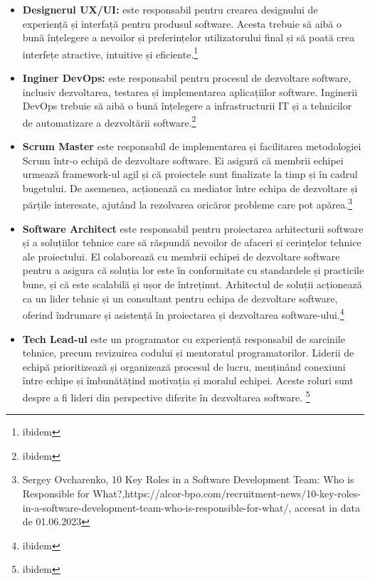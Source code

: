 \documentclass[a4paper, 12pt]{article}
\begin{document}
\begin{itemize}
	\item \textbf{Designerul UX/UI:} este responsabil pentru crearea designului de experiență și interfață pentru produsul software. Acesta trebuie să aibă o bună înțelegere a nevoilor și preferințelor utilizatorului final și să poată crea interfețe atractive, intuitive și eficiente.\footnote{ibidem}

	\item\textbf{Inginer DevOps:}  este responsabil pentru procesul de dezvoltare software, inclusiv dezvoltarea, testarea și implementarea aplicațiilor software. Inginerii DevOps trebuie să aibă o bună înțelegere a infrastructurii IT și a tehnicilor de automatizare a dezvoltării software.\footnote{ibidem}

	\item \textbf{Scrum Master} este responsabil de implementarea și facilitarea metodologiei Scrum într-o echipă de dezvoltare software. Ei asigură că membrii echipei urmează framework-ul agil și că proiectele sunt finalizate la timp și în cadrul bugetului. De asemenea, acționează ca mediator între echipa de dezvoltare și părțile interesate, ajutând la rezolvarea oricăror probleme care pot apărea.\footnote { Sergey Ovcharenko, 10 Key Roles in a Software Development Team: Who is Responsible for What?,https://alcor-bpo.com/recruitment-news/10-key-roles-in-a-software-development-team-who-is-responsible-for-what/, accesat in data de 01.06.2023}

	\item \textbf{ Software Architect} este responsabil pentru proiectarea arhitecturii software și a soluțiilor tehnice care să răspundă nevoilor de afaceri și cerințelor tehnice ale proiectului. El colaborează cu membrii echipei de dezvoltare software pentru a asigura că soluția lor este în conformitate cu standardele și practicile bune, și că este scalabilă și ușor de întreținut. Arhitectul de soluții acționează ca un lider tehnic și un consultant pentru echipa de dezvoltare software, oferind îndrumare și asistență în proiectarea și dezvoltarea software-ului.\footnote{ibidem}

	\item \textbf{Tech Lead-ul} este un programator cu experiență responsabil de sarcinile tehnice, precum revizuirea codului și mentoratul programatorilor. Liderii de echipă prioritizează și organizează procesul de lucru, menținând conexiuni între echipe și îmbunătățind motivația și moralul echipei. Aceste roluri sunt despre a fi lideri din perspective diferite în dezvoltarea software.
\footnote{ibidem}



\end{itemize}
\end{document}
